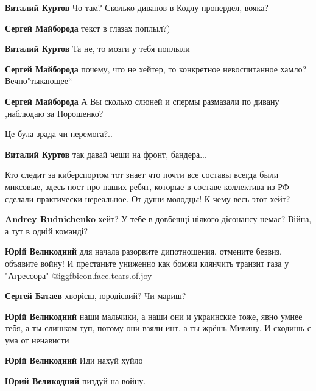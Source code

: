 \begin{itemize}
\begin{itemize} %
\textbf{Виталий Куртов} Чо там? Сколько диванов в Кодлу пропердел, вояка?

\begin{itemize} %
\textbf{Сергей Майборода} текст в глазах поплыл?)

\textbf{Виталий Куртов} Та не, то мозги у тебя поплыли

\textbf{Сергей Майборода} почему, что не хейтер, то конкретное невоспитанное хамло? Вечно"тыкающее“

\textbf{Сергей Майборода} А Вы сколько слюней и спермы размазали по дивану ,наблюдаю за Порошенко?
\end{itemize} %

Це була зрада чи перемога?..

\textbf{Виталий Куртов} так давай чеши на фронт, бандера...

\end{itemize} %


Кто следит за киберспортом тот знает что почти все составы всегда были
миксовые, здесь пост про наших ребят, которые в составе коллектива из РФ
сделали практически нереальное. От души молодцы! К чему весь этот хейт?

\begin{itemize} %
\textbf{Andrey Rudnichenko} хейт? У тебе в довбешці ніякого дісонансу немає? Війна, а тут в одній команді?

\begin{itemize} %
\textbf{Юрій Великодний} для начала разорвите дипотношения, отмените безвиз, объявите войну! И престаньте униженно как бомжи клянчить транзит газа у "Агрессора" @igg{fbicon.face.tears.of.joy} 

\textbf{Сергей Батаев} хворієш, юродієвий? Чи мариш?

\textbf{Юрій Великодний} наши мальчики, а наши они и украинские тоже, явно умнее тебя, а ты слишком туп, потому они взяли инт, а ты жрёшь Мивину. И сходишь с ума от ненависти

\textbf{Юрій Великодний}
Иди нахуй хуйло
\end{itemize} %

\textbf{Юрий Великодний} пиздуй на войну.


\end{itemize}
\end{itemize}
